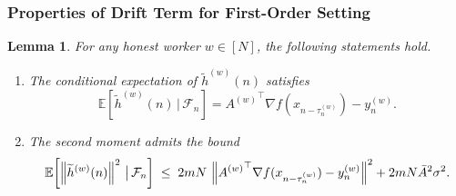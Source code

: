\documentclass{article}
\newtheorem{lemma}[theorem]{Lemma}
\newcommand{\norm}[1]{\left\lVert #1 \right\rVert}
\begin{document}
\subsubsection{Properties of Drift Term for First-Order Setting}

\begin{lemma}
For any honest worker $w \in [N]$, the following statements hold.

\begin{enumerate}
\item[(a)] The conditional expectation of $\widetilde{h}^{(w)}(n)$ satisfies
\begin{equation*}
\mathbb{E}\!\left[\widetilde{h}^{(w)}(n) \,\big|\, \mathcal{F}_n\right] 
= {A^{(w)}}^\top \nabla f(x_{n-\tau_n^{(w)}}) - y_n^{(w)}.
\end{equation*}

\item[(b)] The second moment admits the bound
\begin{equation*}
\mathbb{E}\!\left[\norm{\widetilde{h}^{(w)}(n)}^2 \,\big|\, \mathcal{F}_n\right]
\;\leq\; 
2 mN \, \norm{ {A^{(w)}}^\top\nabla f(x_{n-\tau_n^{(w)}}) - y_n^{(w)} }^2 
+ 2m N \Bar{A}^2 \sigma^2.
\end{equation*}
\end{enumerate}

\label{lem:approximated gradientf}
\end{lemma}
\end{document}
